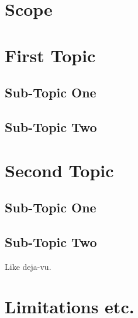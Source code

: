\section{Scope}

\lipsum[7-8]

\section{First Topic} \label{sec:lit:first}
\subsection{Sub-Topic One} \label{sec:lit:first:one}

\lipsum[9-12]

\subsection{Sub-Topic Two} \label{sec:lit:first:two}

\lipsum[3-6]

\section{Second Topic} \label{sec:lit:second}
\subsection{Sub-Topic One} \label{sec:lit:second:one}

\lipsum[9-12]

\subsection{Sub-Topic Two} \label{sec:lit:second:two}
Like deja-vu. 
\lipsum[3-6]

\section{Limitations etc.}

\lipsum[1-4]








